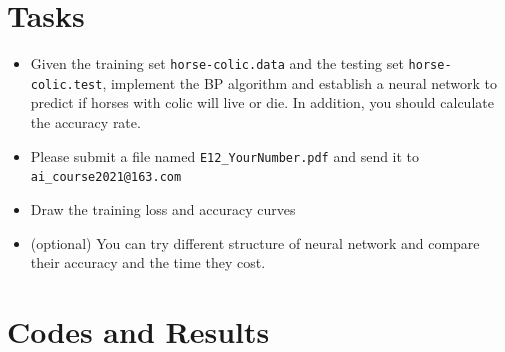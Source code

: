 \documentclass[a4paper, 11pt]{article}
\begin{document}
\section{Tasks}
\begin{itemize}
	\item Given the training set \texttt{horse-colic.data} and the testing set \texttt{horse-colic.test}, implement the BP algorithm and establish a neural network to predict if horses with colic will live or die. In addition, you should calculate the accuracy rate.
	\item Please submit a file named \texttt{E12\_YourNumber.pdf} and send it to \texttt{ai\_course2021@163.com}
	\item Draw the training loss and accuracy curves
	\item (optional) You can try different structure of neural network and compare their accuracy and the time they cost.
\end{itemize}
\section{Codes and Results}


%
%
\end{document}
